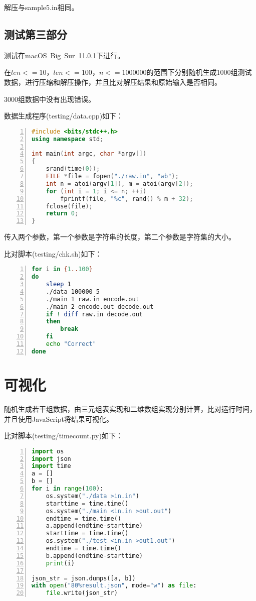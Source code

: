 \documentclass{article}
\begin{document}
解压与sample5.in相同。

\subsection{测试第三部分}

测试在macOS\ Big\ Sur\ 11.0.1下进行。

在$len<=10$，$len<=100$，$n<=1000000$的范围下分别随机生成1000组测试数据，进行压缩和解压操作，并且比对解压结果和原始输入是否相同。

3000组数据中没有出现错误。

数据生成程序(testing/data.cpp)如下：

\begin{lstlisting}[language={C++},
    numbers=left,
    numberstyle=\tiny\consolas,
    basicstyle=\small\consolas]
#include <bits/stdc++.h>
using namespace std;

int main(int argc, char *argv[])
{
    srand(time(0));
    FILE *file = fopen("./raw.in", "wb");
    int n = atoi(argv[1]), m = atoi(argv[2]);
    for (int i = 1; i <= n; ++i)
        fprintf(file, "%c", rand() % m + 32);
    fclose(file);
    return 0;
}
\end{lstlisting}

传入两个参数，第一个参数是字符串的长度，第二个参数是字符集的大小。

比对脚本(testing/chk.sh)如下：

\begin{lstlisting}[language={bash},
    numbers=left,
    numberstyle=\tiny\consolas,
    basicstyle=\small\consolas]
for i in {1..100}
do
    sleep 1
    ./data 100000 5
    ./main 1 raw.in encode.out
    ./main 2 encode.out decode.out
    if ! diff raw.in decode.out
    then
        break
    fi
    echo "Correct"
done
\end{lstlisting}

\section{可视化}

随机生成若干组数据，由三元组表实现和二维数组实现分别计算，比对运行时间，并且使用JavaScript将结果可视化。

比对脚本(testing/timecount.py)如下：

\begin{lstlisting}[language={python},
    numbers=left,
    numberstyle=\tiny\consolas,
    basicstyle=\small\consolas]
import os
import json
import time
a = []
b = []
for i in range(100):
    os.system("./data >in.in")
    starttime = time.time()
    os.system("./main <in.in >out.out")
    endtime = time.time()
    a.append(endtime-starttime)
    starttime = time.time()
    os.system("./test <in.in >out1.out")
    endtime = time.time()
    b.append(endtime-starttime)
    print(i)

json_str = json.dumps([a, b])
with open("80%result.json", mode="w") as file:
    file.write(json_str)
\end{lstlisting}
\end{document}
